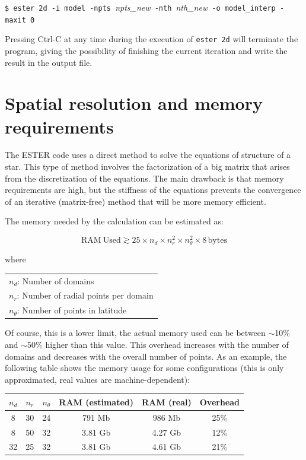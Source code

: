 \medskip
\noindent
\verb|$ ester 2d -i model -npts |{\it npts\_new}\verb| -nth |{\it nth\_new}\verb| -o model_interp -maxit 0|

\medskip
Pressing Ctrl-C at any time during the execution of {\tt ester 2d} will
terminate the program, giving the possibility of finishing the current
iteration and write the result in the output file.

\section{Spatial resolution and memory requirements}

The ESTER code uses a direct method to solve the equations of structure of a star. This type of method
involves the factorization of a big matrix that arises from the discretization of the equations.
The main drawback is that memory requirements are high, but the stiffness of the equations prevents
the convergence of an iterative (matrix-free) method that will be more memory efficient.

The memory needed by the calculation can be estimated as:

$$\mathrm{RAM\ Used}\gtrsim25\times n_d\times n_r^2 \times n_\theta^2 \times 8\, \mathrm{bytes}$$

where

\medskip

\begin{tabular}{l}
$n_d$: Number of domains \\
$n_r$: Number of radial points per domain \\
$n_\theta$: Number of points in latitude \\
\end{tabular}

\medskip

Of course, this is a lower limit, the actual memory used can be between $\sim$10\% and $\sim$50\% higher than
this value.
This overhead increases with the number of domains and decreases with the overall number
of points. As an example, the following table shows the memory usage for some configurations (this is
only approximated, real values are machine-dependent):

\begin{center}
\begin{tabular}{c|c|c|c|c|c}
$n_d$&$n_r$&$n_\theta$&RAM (estimated)&RAM (real)&Overhead\\
\hline
8&30&24& 791 Mb & 986 Mb & 25\% \\
8&50&32& 3.81 Gb & 4.27 Gb & 12\% \\
32&25&32& 3.81 Gb & 4.61 Gb & 21\% \\
\end{tabular}
\end{center}

